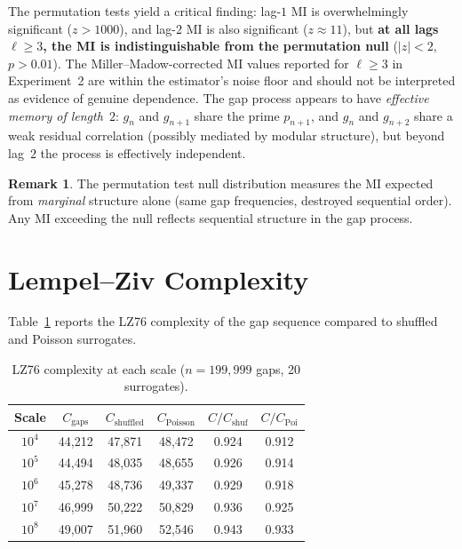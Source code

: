 \documentclass[11pt, a4paper]{amsart}
\theoremstyle{plain}
\theoremstyle{definition}
\newtheorem{remark}[theorem]{Remark}
\begin{document}
The permutation tests yield a critical finding: lag-$1$ MI is overwhelmingly significant ($z > 1000$), and lag-$2$ MI is also significant ($z \approx 11$), but \textbf{at all lags $\ell \ge 3$, the MI is indistinguishable from the permutation null} ($|z| < 2$, $p > 0.01$). The Miller--Madow-corrected MI values reported for $\ell \ge 3$ in Experiment~2 are within the estimator's noise floor and should not be interpreted as evidence of genuine dependence. The gap process appears to have \emph{effective memory of length~$2$}: $g_n$ and $g_{n+1}$ share the prime $p_{n+1}$, and $g_n$ and $g_{n+2}$ share a weak residual correlation (possibly mediated by modular structure), but beyond lag~$2$ the process is effectively independent.

\begin{remark}
The permutation test null distribution measures the MI expected from \emph{marginal} structure alone (same gap frequencies, destroyed sequential order). Any MI exceeding the null reflects sequential structure in the gap process.
\end{remark}


\section{Lempel--Ziv Complexity}
\label{sec:lz}

Table~\ref{tab:lz} reports the LZ76 complexity of the gap sequence compared to shuffled and Poisson surrogates.

\begin{table}[ht]
\centering
\caption{LZ76 complexity at each scale ($n = 199{,}999$ gaps, 20 surrogates).}
\label{tab:lz}
\begin{tabular}{cccccc}
\toprule
Scale & $C_{\text{gaps}}$ & $C_{\text{shuffled}}$ & $C_{\text{Poisson}}$ & $C/C_{\text{shuf}}$ & $C/C_{\text{Poi}}$ \\
\midrule
$10^4$ & 44{,}212 & 47{,}871 & 48{,}472 & 0.924 & 0.912 \\
$10^5$ & 44{,}494 & 48{,}035 & 48{,}655 & 0.926 & 0.914 \\
$10^6$ & 45{,}278 & 48{,}736 & 49{,}337 & 0.929 & 0.918 \\
$10^7$ & 46{,}999 & 50{,}222 & 50{,}829 & 0.936 & 0.925 \\
$10^8$ & 49{,}007 & 51{,}960 & 52{,}546 & 0.943 & 0.933 \\
\bottomrule
\end{tabular}
\end{table}
\end{document}
